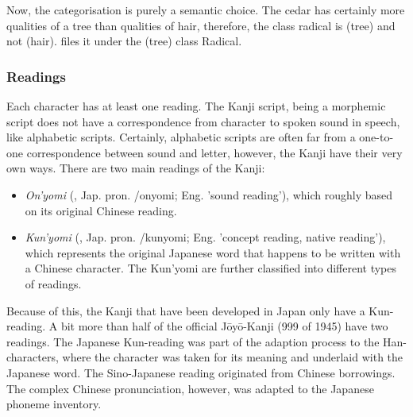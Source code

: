 Now, the categorisation is purely a semantic choice. The cedar has certainly more
qualities of a tree than qualities of hair, therefore, the class radical is
 (tree) and not  (hair).  files it 
under the  (tree) class Radical. %


\subsubsection{Readings}
\label{sec:readings}

Each character has at least one reading. The Kanji script, being a morphemic 
script does not have a correspondence from character to spoken sound in speech,
like alphabetic scripts. Certainly, alphabetic scripts are often far from a 
one-to-one correspondence between sound and letter, however, the Kanji have 
their very own ways. There are two main readings of the Kanji: \\ 
\begin{itemize}
  \item \emph{On'yomi} (, Jap. pron. /onyomi; 
        Eng. 'sound reading'), which roughly based on its original Chinese 
        reading.

  \item \emph{Kun'yomi} (, Jap. pron. /kunyomi; 
        Eng. 'concept reading, native reading'), which represents the original 
        Japanese word that happens to be written with a Chinese character. 
        The Kun'yomi are further classified into different types of readings.
\end{itemize}
Because of this, the Kanji that have been developed in Japan only have a 
Kun-reading. A bit more than half of the official Jōyō-Kanji (999 of 1945)
have two readings.
The Japanese Kun-reading was part of the adaption process to the Han-characters,
where the character was taken for its meaning and underlaid with the Japanese
word. The Sino-Japanese reading originated from Chinese borrowings. The 
complex Chinese pronunciation, however, was adapted to the Japanese 
phoneme inventory.

